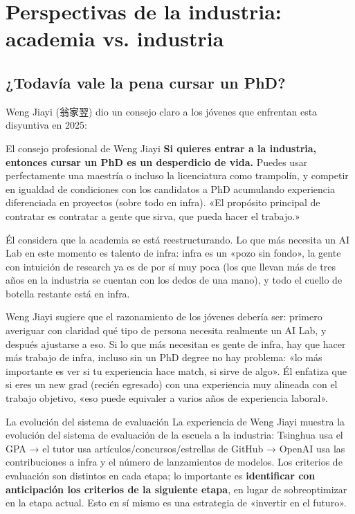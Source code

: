 \section{Perspectivas de la industria: academia vs. industria}

\subsection{¿Todavía vale la pena cursar un PhD?}

Weng Jiayi (翁家翌) dio un consejo claro a los jóvenes que enfrentan esta disyuntiva en 2025:

\begin{importantbox}{El consejo profesional de Weng Jiayi}
\textbf{Si quieres entrar a la industria, entonces cursar un PhD es un desperdicio de vida.} Puedes usar perfectamente una maestría o incluso la licenciatura como trampolín, y competir en igualdad de condiciones con los candidatos a PhD acumulando experiencia diferenciada en proyectos (sobre todo en infra). «El propósito principal de contratar es contratar a gente que sirva, que pueda hacer el trabajo.»
\end{importantbox}

Él considera que la academia se está reestructurando. Lo que más necesita un AI Lab en este momento es talento de infra: infra es un «pozo sin fondo», la gente con intuición de research ya es de por sí muy poca (los que llevan más de tres años en la industria se cuentan con los dedos de una mano), y todo el cuello de botella restante está en infra.

Weng Jiayi sugiere que el razonamiento de los jóvenes debería ser: primero averiguar con claridad qué tipo de persona necesita realmente un AI Lab, y después ajustarse a eso. Si lo que más necesitan es gente de infra, hay que hacer más trabajo de infra, incluso sin un PhD degree no hay problema: «lo más importante es ver si tu experiencia hace match, si sirve de algo». Él enfatiza que si eres un new grad (recién egresado) con una experiencia muy alineada con el trabajo objetivo, «eso puede equivaler a varios años de experiencia laboral».

\begin{knowledgebox}{La evolución del sistema de evaluación}
La experiencia de Weng Jiayi muestra la evolución del sistema de evaluación de la escuela a la industria: Tsinghua usa el GPA → el tutor usa artículos/concursos/estrellas de GitHub → OpenAI usa las contribuciones a infra y el número de lanzamientos de modelos. Los criterios de evaluación son distintos en cada etapa; lo importante es \textbf{identificar con anticipación los criterios de la siguiente etapa}, en lugar de sobreoptimizar en la etapa actual. Esto en sí mismo es una estrategia de «invertir en el futuro».
\end{knowledgebox}

